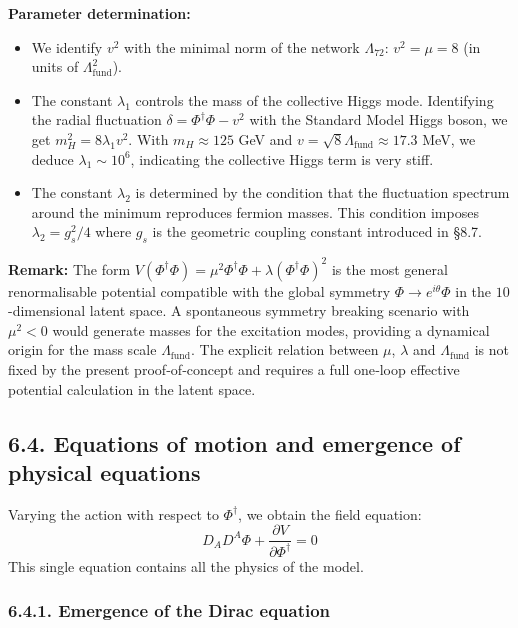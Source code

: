 \documentclass[11pt]{article}
\providecommand{\tightlist}{\setlength{\itemsep}{2pt}\setlength{\parskip}{6pt}}
\providecommand{\tightlist}{%
  \setlength{\itemsep}{2pt}\setlength{\parskip}{6pt}
}
\begin{document}
\textbf{Parameter determination:}

\begin{itemize}
\tightlist
\item
  We identify \(v^2\) with the minimal norm of the network
  \(\Lambda_{72}\): \(v^2 = \mu = 8\) (in units of
  \(\Lambda_{\text{fund}}^2\)).
\item
  The constant \(\lambda_1\) controls the mass of the collective Higgs
  mode. Identifying the radial fluctuation
  \(\delta = \Phi^\dagger \Phi - v^2\) with the Standard Model Higgs
  boson, we get \(m_H^2 = 8\lambda_1 v^2\). With \(m_H \approx 125\) GeV
  and \(v = \sqrt{8}\Lambda_{\text{fund}} \approx 17.3\) MeV, we deduce
  \(\lambda_1 \sim 10^6\), indicating the collective Higgs term is very
  stiff.
\item
  The constant \(\lambda_2\) is determined by the condition that the
  fluctuation spectrum around the minimum reproduces fermion masses.
  This condition imposes \(\lambda_2 = g_s^2/4\) where \(g_s\) is the
  geometric coupling constant introduced in §8.7.
\end{itemize}

\textbf{Remark:} The form
\(V(\Phi^\dagger\Phi) = \mu^2 \Phi^\dagger\Phi + \lambda (\Phi^\dagger\Phi)^2\)
is the most general renormalisable potential compatible with the global
symmetry \(\Phi \to e^{i\theta}\Phi\) in the \(10\)-dimensional latent
space. A spontaneous symmetry breaking scenario with \(\mu^2 < 0\) would
generate masses for the excitation modes, providing a dynamical origin
for the mass scale \(\Lambda_{\text{fund}}\). The explicit relation
between \(\mu\), \(\lambda\) and \(\Lambda_{\text{fund}}\) is not fixed
by the present proof‑of‑concept and requires a full one‑loop effective
potential calculation in the latent space.

\hypertarget{equations-of-motion-and-emergence-of-physical-equations}{%
\subsection{6.4. Equations of motion and emergence of physical
equations}\label{equations-of-motion-and-emergence-of-physical-equations}}

Varying the action with respect to \(\Phi^\dagger\), we obtain the field
equation: \[
\boxed{ D_A D^A \Phi + \frac{\partial V}{\partial \Phi^\dagger} = 0 }
\] This single equation contains all the physics of the model.

\hypertarget{emergence-of-the-dirac-equation}{%
\subsubsection{6.4.1. Emergence of the Dirac
equation}\label{emergence-of-the-dirac-equation}}
\end{document}
